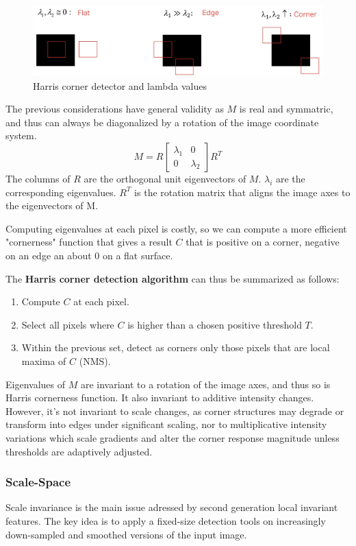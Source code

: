 \documentclass{article}
\begin{document}
\begin{figure}[htbp]
  \centering
  \includegraphics[width=0.9\linewidth]{./img/harris_corner_detector.jpg}
  \caption{Harris corner detector and lambda values}
  \label{fig:harris_corner_detector}
\end{figure}

The previous considerations have general validity as $M$ is real and symmatric, and thus can always be diagonalized by a rotation of the image coordinate system.
$$M = R\begin{bmatrix} \lambda_1 & 0 \\ 0 & \lambda_2 \end{bmatrix}R^T$$
The columns of $R$ are the orthogonal unit eigenvectors of $M$.
$\lambda_i$ are the corresponding eigenvalues.
$R^T$ is the rotation matrix that aligns the image axes to the eigenvectors of M.

Computing eigenvalues at each pixel is costly, so we can compute a more efficient "cornerness" function that gives a result $C$ that is positive on a corner, negative on an edge an about 0 on a flat surface.

The \textbf{Harris corner detection algorithm} can thus be summarized as follows:
\begin{enumerate}
  \item Compute $C$ at each pixel.
  \item Select all pixels where $C$ is higher than a chosen positive threshold $T$.
  \item Within the previous set, detect as corners only those pixels that are local maxima of $C$ (NMS).
\end{enumerate}

Eigenvalues of $M$ are invariant to a rotation of the image axes, and thus so is Harris cornerness function.
It also invariant to additive intensity changes.
However, it's not invariant to scale changes, as corner structures may degrade or transform into edges under significant scaling, nor to multiplicative intensity variations which scale gradients and alter the corner response magnitude unless thresholds are adaptively adjusted.

\subsubsection{Scale-Space}
Scale invariance is the main issue adressed by second generation local invariant features.
The key idea is to apply a fixed-size detection tools on increasingly down-sampled and smoothed versions of the input image.
\end{document}
